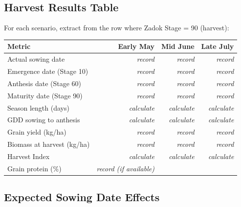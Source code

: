 \subsection{Harvest Results Table}

For each scenario, extract from the row where Zadok Stage = 90 (harvest):

\begin{center}
\begin{tabular}{l|r|r|r}
\textbf{Metric} & \textbf{Early May} & \textbf{Mid June} & \textbf{Late July} \\
\hline
Actual sowing date & \textit{record} & \textit{record} & \textit{record} \\
Emergence date (Stage 10) & \textit{record} & \textit{record} & \textit{record} \\
Anthesis date (Stage 60) & \textit{record} & \textit{record} & \textit{record} \\
Maturity date (Stage 90) & \textit{record} & \textit{record} & \textit{record} \\
Season length (days) & \textit{calculate} & \textit{calculate} & \textit{calculate} \\
GDD sowing to anthesis & \textit{calculate} & \textit{calculate} & \textit{calculate} \\
Grain yield (kg/ha) & \textit{record} & \textit{record} & \textit{record} \\
Biomass at harvest (kg/ha) & \textit{record} & \textit{record} & \textit{record} \\
Harvest Index & \textit{calculate} & \textit{calculate} & \textit{calculate} \\
Grain protein (\%) & \textit{record (if available)} & & \\
\end{tabular}
\end{center}

\subsection{Expected Sowing Date Effects}

